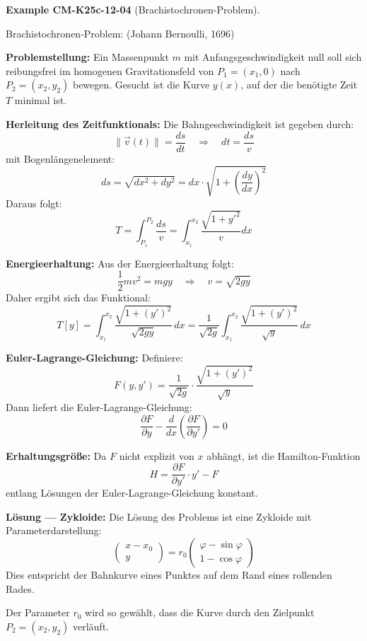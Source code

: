\documentclass[10pt, letterpaper]{article}
\newcommand{\CustomHeading}[3]{%
  \par\medskip\noindent%
  \textbf{#1 #2} \textnormal{(#3)}.\enskip%
}
\newenvironment{EXA}[2]{\begin{unitbox}\CustomHeading{Example}{#1}{#2}}{\end{unitbox}}
\begin{document}
\begin{EXA}{CM-K25c-12-04}{Brachistochronen-Problem}
Brachistochronen-Problem: (Johann Bernoulli, 1696)

\begin{center}
\end{center}

\textbf{Problemstellung:} Ein Massenpunkt $m$ mit Anfangsgeschwindigkeit null soll sich reibungsfrei im homogenen Gravitationsfeld von $P_1 = (x_1, 0)$ nach $P_2 = (x_2, y_2)$ bewegen. Gesucht ist die Kurve $y(x)$, auf der die benötigte Zeit $T$ minimal ist.

\textbf{Herleitung des Zeitfunktionals:} Die Bahngeschwindigkeit ist gegeben durch:
\[
\|\vec{v}(t)\| = \frac{ds}{dt} \quad \Rightarrow \quad dt = \frac{ds}{v}
\]
mit Bogenlängenelement:
\[
ds = \sqrt{dx^2 + dy^2} = dx \cdot \sqrt{1 + \left( \frac{dy}{dx} \right)^2}
\]
Daraus folgt:
\[
T = \int_{P_1}^{P_2} \frac{ds}{v} = \int_{x_1}^{x_2} \frac{\sqrt{1 + y'^2}}{v} dx
\]

\textbf{Energieerhaltung:} Aus der Energieerhaltung folgt:
\[
\frac{1}{2}mv^2 = mgy \quad \Rightarrow \quad v = \sqrt{2gy}
\]
Daher ergibt sich das Funktional:
\[
T[y] = \int_{x_1}^{x_2} \frac{\sqrt{1 + (y')^2}}{\sqrt{2gy}}\, dx
= \frac{1}{\sqrt{2g}} \int_{x_1}^{x_2} \frac{\sqrt{1 + (y')^2}}{\sqrt{y}}\, dx
\]

\textbf{Euler-Lagrange-Gleichung:} Definiere:
\[
F(y, y') = \frac{1}{\sqrt{2g}} \cdot \frac{\sqrt{1 + (y')^2}}{\sqrt{y}}
\]
Dann liefert die Euler-Lagrange-Gleichung:
\[
\frac{\partial F}{\partial y} - \frac{d}{dx} \left( \frac{\partial F}{\partial y'} \right) = 0
\]

\textbf{Erhaltungsgröße:} Da $F$ nicht explizit von $x$ abhängt, ist die Hamilton-Funktion
\[
H = \frac{\partial F}{\partial y'} \cdot y' - F
\]
entlang Lösungen der Euler-Lagrange-Gleichung konstant.

\textbf{Lösung — Zykloide:} Die Lösung des Problems ist eine Zykloide mit Parameterdarstellung:
\[
\begin{pmatrix} x - x_0 \\ y \end{pmatrix}
= r_0 \begin{pmatrix} \varphi - \sin\varphi \\ 1 - \cos\varphi \end{pmatrix}
\]
Dies entspricht der Bahnkurve eines Punktes auf dem Rand eines rollenden Rades.

Der Parameter $r_0$ wird so gewählt, dass die Kurve durch den Zielpunkt $P_2 = (x_2, y_2)$ verläuft.
\end{EXA}
\end{document}

